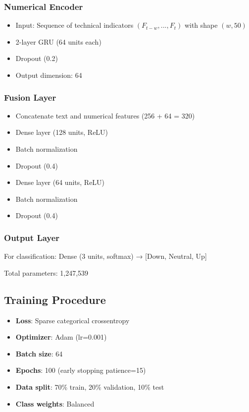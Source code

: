 \documentclass[conference]{IEEEtran}
\begin{document}
\subsubsection{Numerical Encoder}
\begin{itemize}
    \item Input: Sequence of technical indicators $(F_{t-w}, ..., F_t)$ with shape $(w, 50)$
    \item 2-layer GRU (64 units each)
    \item Dropout (0.2)
    \item Output dimension: 64
\end{itemize}

\subsubsection{Fusion Layer}
\begin{itemize}
    \item Concatenate text and numerical features (256 + 64 = 320)
    \item Dense layer (128 units, ReLU)
    \item Batch normalization
    \item Dropout (0.4)
    \item Dense layer (64 units, ReLU)
    \item Batch normalization
    \item Dropout (0.4)
\end{itemize}

\subsubsection{Output Layer}
For classification: Dense (3 units, softmax) → [Down, Neutral, Up]

Total parameters: 1,247,539

\subsection{Training Procedure}

\begin{itemize}
    \item \textbf{Loss}: Sparse categorical crossentropy
    \item \textbf{Optimizer}: Adam (lr=0.001)
    \item \textbf{Batch size}: 64
    \item \textbf{Epochs}: 100 (early stopping patience=15)
    \item \textbf{Data split}: 70\% train, 20\% validation, 10\% test
    \item \textbf{Class weights}: Balanced
\end{itemize}
\end{document}

